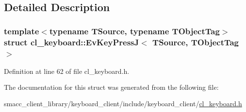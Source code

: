 \subsection{Detailed Description}
\subsubsection*{template$<$typename T\+Source, typename T\+Object\+Tag$>$\newline
struct cl\+\_\+keyboard\+::\+Ev\+Key\+Press\+J$<$ T\+Source, T\+Object\+Tag $>$}



Definition at line 62 of file cl\+\_\+keyboard.\+h.



The documentation for this struct was generated from the following file\+:\begin{DoxyCompactItemize}
\item 
smacc\+\_\+client\+\_\+library/keyboard\+\_\+client/include/keyboard\+\_\+client/\hyperlink{cl__keyboard_8h}{cl\+\_\+keyboard.\+h}\end{DoxyCompactItemize}
